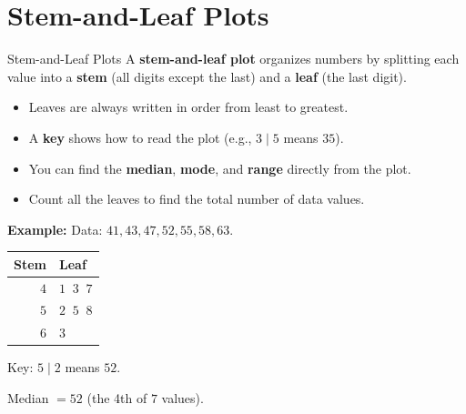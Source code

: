 \section{Stem-and-Leaf Plots}

\begin{quickReview}{Stem-and-Leaf Plots}
A \textbf{stem-and-leaf plot} organizes numbers by splitting each value into a \textbf{stem} (all digits except the last) and a \textbf{leaf} (the last digit).

\begin{itemize}[leftmargin=*]
    \item Leaves are always written in order from least to greatest.
    \item A \textbf{key} shows how to read the plot (e.g., $3 \mid 5$ means $35$).
    \item You can find the \textbf{median}, \textbf{mode}, and \textbf{range} directly from the plot.
    \item Count all the leaves to find the total number of data values.
\end{itemize}

\medskip
\textbf{Example:} Data: $41, 43, 47, 52, 55, 58, 63$.

\begin{center}
\begin{tabular}{r|l}
    \textbf{Stem} & \textbf{Leaf} \\
    \hline
    $4$ & $1\;\;3\;\;7$ \\
    $5$ & $2\;\;5\;\;8$ \\
    $6$ & $3$
\end{tabular}
\quad Key: $5 \mid 2$ means $52$.
\end{center}
Median $= 52$ (the 4th of $7$ values).
\end{quickReview}

